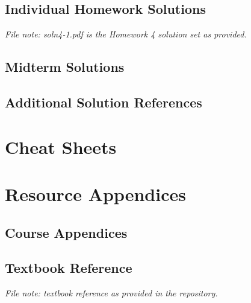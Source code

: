 \documentclass[12pt]{article}
\begin{document}
\subsection*{Individual Homework Solutions}



\noindent\textit{File note: soln4-1.pdf is the Homework 4 solution set as provided.}






\subsection*{Midterm Solutions}



\subsection*{Additional Solution References}


\section*{Cheat Sheets}




\section*{Resource Appendices}
\subsection*{Course Appendices}






\subsection*{Textbook Reference}
\noindent\textit{File note: textbook reference as provided in the repository.}

\end{document}
